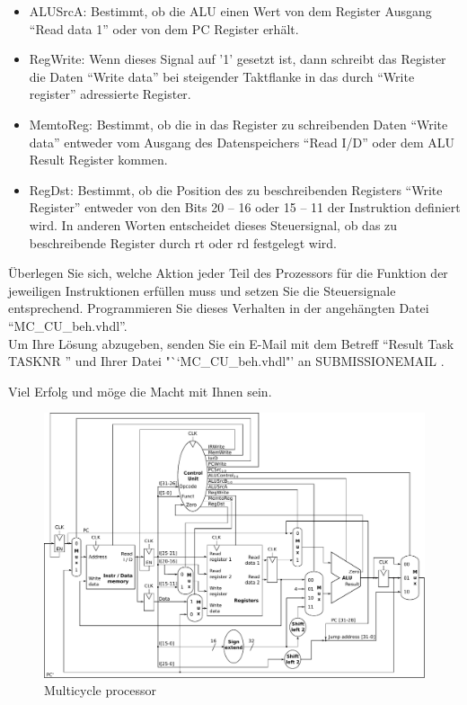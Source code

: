 \documentclass[a4paper,12pt]{article}
\begin{document}
\begin{itemize}
\item{ALUSrcA: Bestimmt, ob die ALU einen Wert von dem Register Ausgang "`Read data 1"' oder von dem PC Register erh\"alt.}

\item{RegWrite: Wenn dieses Signal auf '1' gesetzt ist, dann schreibt das Register die Daten "`Write data"' bei steigender Taktflanke in das durch "`Write register"' adressierte Register.}

\item{MemtoReg: Bestimmt, ob die in das Register zu schreibenden Daten "`Write data"' entweder vom Ausgang des Datenspeichers "`Read I/D"' oder dem ALU Result Register kommen.}

\item{RegDst: Bestimmt, ob die Position des zu beschreibenden Registers "`Write Register"' entweder von den Bits 20 -- 16 oder 15 -- 11 der Instruktion definiert wird. In anderen Worten entscheidet dieses Steuersignal, ob das zu beschreibende Register durch rt oder rd festgelegt wird.}

\end{itemize}

\"Uberlegen Sie sich, welche Aktion jeder Teil des Prozessors f\"ur die Funktion der jeweiligen Instruktionen erf\"ullen muss und setzen Sie die Steuersignale entsprechend. Programmieren Sie dieses Verhalten in der angeh\"angten Datei "`MC\_CU\_beh.vhdl"'.\\

Um Ihre L\"osung abzugeben, senden Sie ein E-Mail mit dem Betreff "`Result Task {{ TASKNR }}"' und Ihrer Datei "``MC\_CU\_beh.vhdl"'  an {{ SUBMISSIONEMAIL }}.

\vspace{0.7cm}
Viel Erfolg und m\"oge die Macht mit Ihnen sein.


\begin{landscape}
\begin{figure}[!h]
\vspace{-1cm}
\hspace{-1.8cm}
\includegraphics[width=25.5cm]{../static/Multicycle_Processor_V_1_3} %
\caption{Multicycle processor}
\label{fig:MulticycleProcessor}
\end{figure}
\end{landscape}
\end{document}
